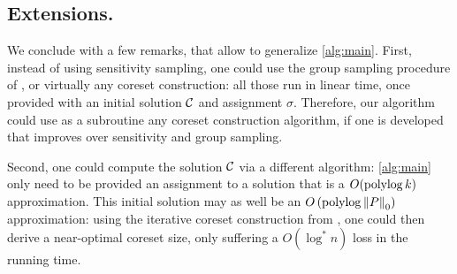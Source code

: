 %
%
%
%
%

\subsection*{Extensions.} 
We conclude with a few remarks, that allow to generalize \cref{alg:main}.
First, instead of using sensitivity sampling, one could use the group sampling procedure of \cite{stoc21}, or virtually any coreset construction: all those run in linear time, once provided with an initial solution $\mathcal C$ and assignment $\sigma$. 
Therefore, our algorithm could use as a subroutine any coreset construction algorithm, if one is developed that improves over sensitivity and group sampling.

Second, one could compute the solution $\mathcal C$ via a different algorithm: \cref{alg:main} only need to be provided an assignment to a solution that is a $O(\operatorname{polylog} k)$ approximation. 
This initial solution may as well be an $O\left(\operatorname{polylog} \left\| P \right\|_0 \right)$ approximation: using the iterative coreset construction from \cite{BravermanJKW21}, one could then derive a near-optimal coreset size, only suffering a $O(\log^* n)$ loss in the running time.

